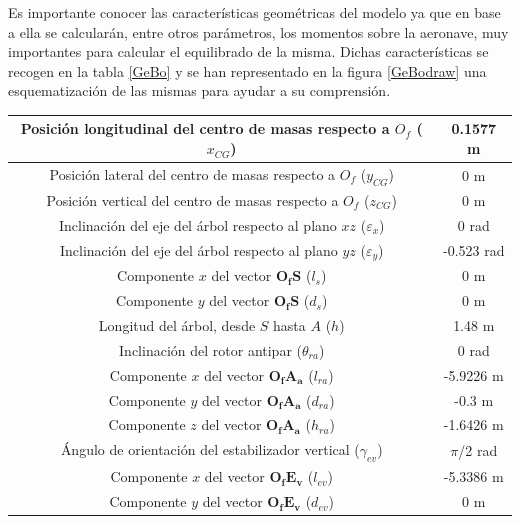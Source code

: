 Es importante conocer las características geométricas del modelo ya que en base a ella se calcularán, entre otros parámetros, los momentos sobre la aeronave, muy importantes para calcular el equilibrado de la misma.
Dichas características se recogen en la tabla \ref{GeBo} y se han representado en la figura \ref{GeBodraw} una esquematización de las mismas para ayudar a su comprensión.

\begin{table}[htbp]
	\centering
	\begin{tabular}{|>{\columncolor{Gray}}c|c|}
		\hline
		\cellcolor{Gray}Posición longitudinal del centro de masas respecto a $O_f$ ($x_{CG}$) & 0.1577 m \\ \hline
		\cellcolor{Gray}Posición lateral del centro de masas respecto a $O_f$ ($y_{CG}$) & 0 m \\ \hline
		\cellcolor{Gray}Posición vertical del centro de masas respecto a $O_f$ ($z_{CG}$) & 0 m \\ \hline
		\cellcolor{Gray}Inclinación del eje del árbol respecto al plano $xz$ ($\varepsilon_x$) & 0 rad \\ \hline
		\cellcolor{Gray}Inclinación del eje del árbol respecto al plano $yz$ ($\varepsilon_y$) & -0.523 rad \\ \hline
		\cellcolor{Gray}Componente $x$ del vector $\boldsymbol{O_fS}$ ($l_s$) & 0 m \\ \hline
		\cellcolor{Gray}Componente $y$ del vector $\boldsymbol{O_fS}$ ($d_s$) & 0 m \\ \hline
		\cellcolor{Gray}Longitud del árbol, desde $S$ hasta $A$ ($h$) & 1.48 m \\ \hline
		\cellcolor{Gray}Inclinación del rotor antipar ($\theta_{ra}$) & 0 rad \\ \hline
		\cellcolor{Gray}Componente $x$ del vector $\boldsymbol{O_fA_a}$ ($l_{ra}$) & -5.9226 m \\ \hline
		\cellcolor{Gray}Componente $y$ del vector $\boldsymbol{O_fA_a}$ ($d_{ra}$) & -0.3 m \\ \hline
		\cellcolor{Gray}Componente $z$ del vector $\boldsymbol{O_fA_a}$ ($h_{ra}$) & -1.6426 m \\ \hline
		\cellcolor{Gray}Ángulo de orientación del estabilizador vertical ($\gamma_{ev}$) & $\pi$/2 rad \\ \hline
		\cellcolor{Gray}Componente $x$ del vector $\boldsymbol{O_fE_v}$ ($l_{ev}$) & -5.3386 m \\ \hline
		\cellcolor{Gray}Componente $y$ del vector $\boldsymbol{O_fE_v}$ ($d_{ev}$) & 0 m \\ \hline

\end{tabular}
\end{table}
